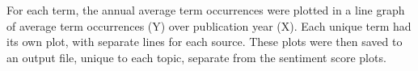 \documentclass{report}
\begin{document}
For each term, the annual average term occurrences were plotted in a line graph of average term occurrences (Y) over publication year (X).
Each unique term had its own plot, with separate lines for each source. 
These plots were then saved to an output file, unique to each topic, separate from the sentiment score plots.





\end{document}
